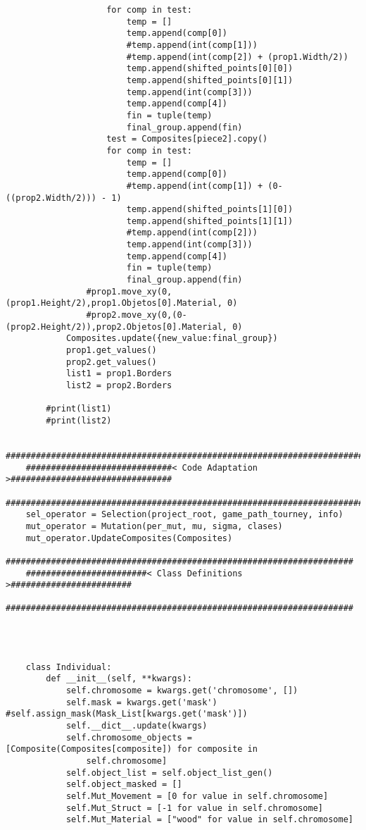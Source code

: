 \begin{verbatim}
                    for comp in test:
                        temp = []
                        temp.append(comp[0])
                        #temp.append(int(comp[1]))
                        #temp.append(int(comp[2]) + (prop1.Width/2))
                        temp.append(shifted_points[0][0])
                        temp.append(shifted_points[0][1])
                        temp.append(int(comp[3]))
                        temp.append(comp[4])
                        fin = tuple(temp)
                        final_group.append(fin)
                    test = Composites[piece2].copy()
                    for comp in test:
                        temp = []
                        temp.append(comp[0])
                        #temp.append(int(comp[1]) + (0-((prop2.Width/2))) - 1)
                        temp.append(shifted_points[1][0])
                        temp.append(shifted_points[1][1])
                        #temp.append(int(comp[2]))
                        temp.append(int(comp[3]))
                        temp.append(comp[4])
                        fin = tuple(temp)
                        final_group.append(fin)
                #prop1.move_xy(0,(prop1.Height/2),prop1.Objetos[0].Material, 0)
                #prop2.move_xy(0,(0-(prop2.Height/2)),prop2.Objetos[0].Material, 0)
            Composites.update({new_value:final_group})
            prop1.get_values()
            prop2.get_values()
            list1 = prop1.Borders
            list2 = prop2.Borders

        #print(list1)
        #print(list2)

    ################################################################################
    #############################< Code Adaptation >################################
    ################################################################################
    sel_operator = Selection(project_root, game_path_tourney, info)
    mut_operator = Mutation(per_mut, mu, sigma, clases)
    mut_operator.UpdateComposites(Composites)
    #####################################################################
    ########################< Class Definitions >########################
    #####################################################################

    
        
        
    class Individual:
        def __init__(self, **kwargs):
            self.chromosome = kwargs.get('chromosome', [])
            self.mask = kwargs.get('mask') #self.assign_mask(Mask_List[kwargs.get('mask')])
            self.__dict__.update(kwargs)
            self.chromosome_objects = [Composite(Composites[composite]) for composite in 
                self.chromosome]
            self.object_list = self.object_list_gen()
            self.object_masked = []
            self.Mut_Movement = [0 for value in self.chromosome]
            self.Mut_Struct = [-1 for value in self.chromosome]
            self.Mut_Material = ["wood" for value in self.chromosome]


\end{verbatim}
